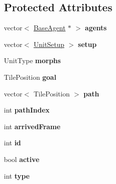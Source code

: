 \subsection*{Protected Attributes}
\begin{DoxyCompactItemize}
\item 
\hypertarget{class_squad_a2c48f28477afce64363abcf6fdd16267}{vector$<$ \hyperlink{class_base_agent}{Base\-Agent} $\ast$ $>$ {\bfseries agents}}\label{class_squad_a2c48f28477afce64363abcf6fdd16267}

\item 
\hypertarget{class_squad_a1279839458e968bf9199e06c1ea25a5b}{vector$<$ \hyperlink{class_unit_setup}{Unit\-Setup} $>$ {\bfseries setup}}\label{class_squad_a1279839458e968bf9199e06c1ea25a5b}

\item 
\hypertarget{class_squad_aecd30d9008a50c452476451bfe17d698}{Unit\-Type {\bfseries morphs}}\label{class_squad_aecd30d9008a50c452476451bfe17d698}

\item 
\hypertarget{class_squad_a389f7858c6eb3efc3aeca51686feda22}{Tile\-Position {\bfseries goal}}\label{class_squad_a389f7858c6eb3efc3aeca51686feda22}

\item 
\hypertarget{class_squad_a1ba210ba4ac596890f844aceef2ee9ed}{vector$<$ Tile\-Position $>$ {\bfseries path}}\label{class_squad_a1ba210ba4ac596890f844aceef2ee9ed}

\item 
\hypertarget{class_squad_a430cbe8e490d363ea6cee839bd1e115b}{int {\bfseries path\-Index}}\label{class_squad_a430cbe8e490d363ea6cee839bd1e115b}

\item 
\hypertarget{class_squad_aa5b09834c9fec2d519d76126125c6f3a}{int {\bfseries arrived\-Frame}}\label{class_squad_aa5b09834c9fec2d519d76126125c6f3a}

\item 
\hypertarget{class_squad_a155be0cd97fe85c4fd732fe3e42e0756}{int {\bfseries id}}\label{class_squad_a155be0cd97fe85c4fd732fe3e42e0756}

\item 
\hypertarget{class_squad_a9bb4b01308b969ce1401879b2dd98060}{bool {\bfseries active}}\label{class_squad_a9bb4b01308b969ce1401879b2dd98060}

\item 
\hypertarget{class_squad_a1bd6f2a865e3ca951900fa09a239e952}{int {\bfseries type}}\label{class_squad_a1bd6f2a865e3ca951900fa09a239e952}


\end{DoxyCompactItemize}

